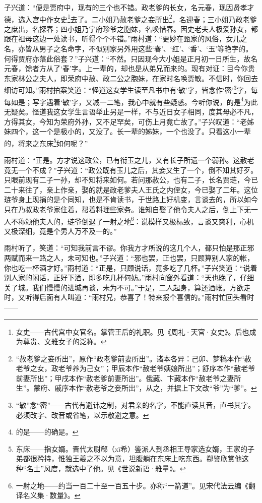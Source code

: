 \par 子兴道：“便是贾府中，现有的三个也不错。政老爹的长女，名元春，现因贤孝才德，选入宫中作女史\footnote{女史——古代宫中女官名。掌管王后的礼职。见《周礼·天官·女史》。后也成为尊贵、文雅女子的泛称。}去了。二小姐乃赦老爹之妾所出\footnote{“赦老爹之妾所出”，原作“政老爹前妻所出”。诸本各异：己卯、梦稿本作“赦老爷之女，政老爷养为己女”；甲辰本作“赦老爷姨娘所出”；舒序本作“赦老爷前妻所出”；甲戌本作“赦老爹前妻所出”。俄藏、卞藏本作“赦老爷之妻所生”。蒙府、戚序本作“赦老爷之妾所出”，从之，并据上下文改“爷”为“爹”。}，名迎春；三小姐乃政老爹之庶出，名探春；四小姐乃宁府珍爷之胞妹，名唤惜春。因史老夫人极爱孙女，都跟在祖母这边一处读书，听得个个不错。”雨村道：“更妙在甄家的风俗，女儿之名，亦皆从男子之名命字，不似别家另外用这些‘春’、‘红’、‘香’、‘玉’等艳字的。何得贾府亦落此俗套？”子兴道：“不然。只因现今大小姐是正月初一日所生，故名元春，馀者方从了‘春’字。上一辈的，却也是从弟兄而来的。现有对证：目今你贵东家林公之夫人，即荣府中赦、政二公之胞妹，在家时名唤贾敏。不信时，你回去细访可知。”雨村拍案笑道：“怪道这女学生读至凡书中有‘敏’字，皆念作‘密’\footnote{“敏”念“密”——古代有避讳之制，对君亲的名字，不能直读其音，直书其字。必须改字、改音或省笔，以示敬避之意。}字，每每如是；写字遇着‘敏’字，又减一二笔，我心中就有些疑惑。今听你说，的是\footnote{的是——的确是。}为此无疑矣。怪道我这女学生言语举止另是一样，不与近日女子相同，度其母必不凡，方得其女，今知为荣府外孙，又不足罕矣，可伤上月竟亡故了。”子兴叹道：“老姊妹四个，这一个是极小的，又没了。长一辈的姊妹，一个也没了。只看这小一辈的，将来之东床\footnote{东床——指女婿。晋代太尉郗（xī希）鉴派人到丞相王导家选女婿，王家的子弟都很矜持，惟独王羲之不以为意，坦腹躺在东床上吃东西。郗鉴欣赏他这种“名士”风度，就选中了他。见《世说新语·雅量》。}如何呢？”
\par 雨村道：“正是。方才说这政公，已有衔玉之儿，又有长子所遗一个弱孙。这赦老竟无一个不成？”子兴道：“政公既有玉儿之后，其妾又生了一个，倒不知其好歹。只眼前现有二子一孙，却不知将来如何。若问那赦公，也有二子，长名贾琏，今已二十来往了，亲上作亲，娶的就是政老爹夫人王氏之内侄女，今已娶了二年。这位琏爷身上现捐的是个同知，也是不肯读书，于世路上好机变，言谈去的，所以如今只在乃叔政老爷家住着，帮着料理些家务。谁知自娶了他令夫人之后，倒上下无一人不称颂他夫人的，琏爷倒退了一射之地\footnote{一射之地——约当一百二十至一百五十步。亦称“一箭道”。见宋代法云编《翻译名义集·数量》。}：说模样又极标致，言谈又爽利，心机又极深细，竟是个男人万不及一的。”
\par 雨村听了，笑道：“可知我前言不谬。你我方才所说的这几个人，都只怕是那正邪两赋而来一路之人，未可知也。”子兴道：“邪也罢，正也罢，只顾算别人家的帐，你也吃一杯酒才好。”雨村道：“正是，只顾说话，竟多吃了几杯。”子兴笑道：“说着别人家的闲话，正好下酒，即多吃几杯何妨。”雨村向窗外看道：“天也晚了，仔细关了城。我们慢慢的进城再谈，未为不可。”于是，二人起身，算还酒帐。方欲走时，又听得后面有人叫道：“雨村兄，恭喜了！特来报个喜信的。”雨村忙回头看时——


